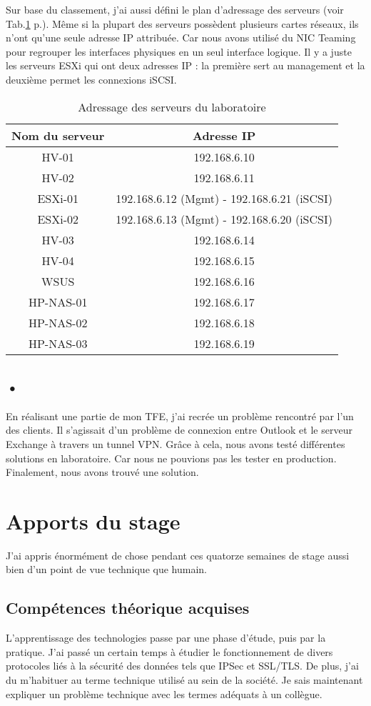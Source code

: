 Sur base du classement, j'ai aussi défini le plan d'adressage des serveurs (voir Tab.\ref{tab:addIP} p.\pageref{tab:addIP}).
Même si la plupart des serveurs possèdent plusieurs cartes réseaux, ils n'ont qu'une seule adresse IP attribuée.
Car nous avons utilisé du NIC Teaming pour regrouper les interfaces physiques en un seul interface logique.
Il y a juste les serveurs ESXi qui ont deux adresses IP : la première sert au management et la deuxième permet les connexions iSCSI.
\begin{table}
\centering
\begin{tabular}{cc}
\toprule
Nom du serveur & Adresse IP \\
\midrule
HV-01 & 192.168.6.10 \\ 
HV-02 & 192.168.6.11 \\ 
ESXi-01 & 192.168.6.12 (Mgmt) - 192.168.6.21 (iSCSI) \\ 
ESXi-02 & 192.168.6.13 (Mgmt) - 192.168.6.20 (iSCSI) \\ 
HV-03 & 192.168.6.14 \\ 
HV-04 & 192.168.6.15 \\ 
WSUS & 192.168.6.16 \\ 
HP-NAS-01 & 192.168.6.17 \\ 
HP-NAS-02 & 192.168.6.18 \\ 
HP-NAS-03 & 192.168.6.19 \\
\bottomrule
\end{tabular}
\caption{Adressage des serveurs du laboratoire}
\label{tab:addIP}
\end{table}

\subsection{•}
En réalisant une partie de mon TFE, j'ai recrée un problème rencontré par l'un des clients.
Il s'agissait d'un problème de connexion entre Outlook et le serveur Exchange à travers un tunnel VPN.
Grâce à cela, nous avons testé différentes solutions en laboratoire.
Car nous ne pouvions pas les tester en production. 
Finalement, nous avons trouvé une solution.
\section{Apports du stage}
J'ai appris énormément de chose pendant ces quatorze semaines de stage aussi bien d'un point de vue technique que humain.

\subsection{Compétences théorique acquises}
L'apprentissage des technologies passe par une phase d'étude, puis par la pratique.
J'ai passé un certain temps à étudier le fonctionnement de divers protocoles liés à la sécurité des données tels que IPSec et SSL/TLS.
De plus, j'ai du m'habituer au terme technique utilisé au sein de la société.
Je sais maintenant expliquer un problème technique avec les termes adéquats à un collègue.

